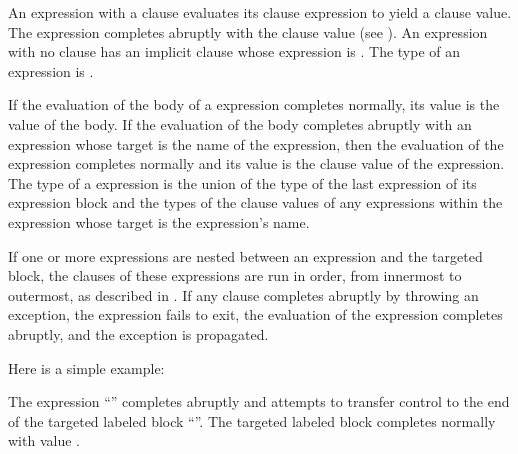 An  expression with a  clause
evaluates its  clause expression to yield a  clause value.
The  expression completes abruptly with the  clause value
(see ).
An  expression with no  clause
has an implicit  clause whose expression is \EXP{()}.
The type of an  expression is .

If the evaluation of the body of a  expression completes normally,
its value is the value of the body.
If the evaluation of the body completes abruptly
with an  expression whose target
is the name of the  expression,
then the evaluation of the  expression completes normally
and its value is the  clause value of the  expression.
The type of a  expression
is the union of the type of the last expression of its expression block
and the types of the  clause values of
any  expressions within the  expression
whose target is the  expression's name.

If one or more  expressions are nested between an
 expression and the targeted  block, the 
clauses of these expressions are run in order, from innermost to
outermost, as described in .  If any 
clause completes abruptly by throwing an exception, the 
expression fails to exit, the evaluation of the  expression
completes abruptly, and the exception is propagated.

Here is a simple example:

The expression ``'' completes
abruptly and attempts to transfer control to the end of the
targeted labeled block ``''.
The targeted labeled block completes normally with value .
